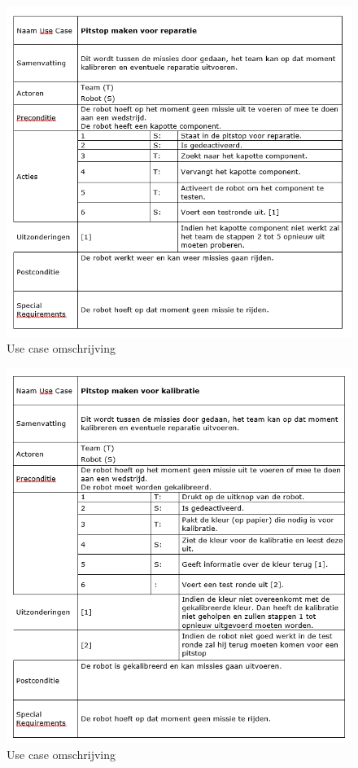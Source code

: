 \documentclass[12pt]{article} %
\begin{document}
\begin{center}
\begin{figure}
\includegraphics[scale=.9]{uc3.png}
\caption{Use case omschrijving}
\label{fig:usecase}
\end{figure}
\end{center}

\begin{center}
\begin{figure}
\includegraphics[scale=.9]{uc4.png}
\caption{Use case omschrijving}
\label{fig:usecase}
\end{figure}
\end{center}
\end{document}
